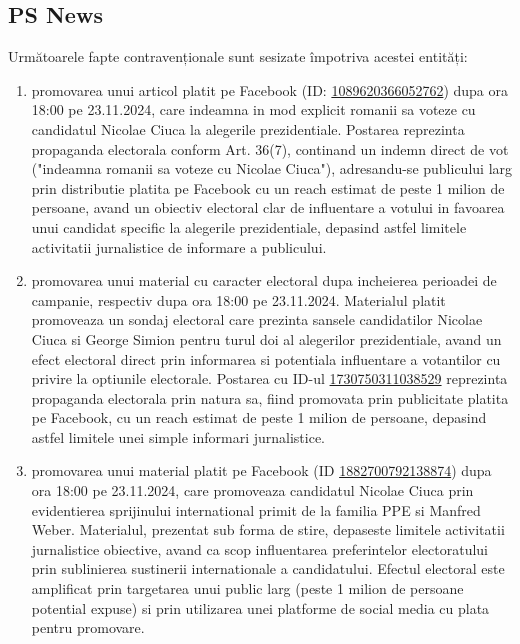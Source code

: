 \documentclass[a4paper,12pt]{article}
\begin{document}
\vspace{0.5cm}

\subsection{PS News}
Următoarele fapte contravenționale sunt sesizate împotriva acestei entități:

\begin{enumerate}[leftmargin=*, label=\arabic*.)]
    \item promovarea unui articol platit pe Facebook (ID: \href{https://www.facebook.com/ads/library/?id=1089620366052762}{1089620366052762}) dupa ora 18:00 pe 23.11.2024, care indeamna in mod explicit romanii sa voteze cu candidatul Nicolae Ciuca la alegerile prezidentiale. Postarea reprezinta propaganda electorala conform Art. 36(7), continand un indemn direct de vot ("indeamna romanii sa voteze cu Nicolae Ciuca"), adresandu-se publicului larg prin distributie platita pe Facebook cu un reach estimat de peste 1 milion de persoane, avand un obiectiv electoral clar de influentare a votului in favoarea unui candidat specific la alegerile prezidentiale, depasind astfel limitele activitatii jurnalistice de informare a publicului.
    \item promovarea unui material cu caracter electoral dupa incheierea perioadei de campanie, respectiv dupa ora 18:00 pe 23.11.2024. Materialul platit promoveaza un sondaj electoral care prezinta sansele candidatilor Nicolae Ciuca si George Simion pentru turul doi al alegerilor prezidentiale, avand un efect electoral direct prin informarea si potentiala influentare a votantilor cu privire la optiunile electorale. Postarea cu ID-ul \href{https://www.facebook.com/ads/library/?id=1730750311038529}{1730750311038529} reprezinta propaganda electorala prin natura sa, fiind promovata prin publicitate platita pe Facebook, cu un reach estimat de peste 1 milion de persoane, depasind astfel limitele unei simple informari jurnalistice.
    \item promovarea unui material platit pe Facebook (ID \href{https://www.facebook.com/ads/library/?id=1882700792138874}{1882700792138874}) dupa ora 18:00 pe 23.11.2024, care promoveaza candidatul Nicolae Ciuca prin evidentierea sprijinului international primit de la familia PPE si Manfred Weber. Materialul, prezentat sub forma de stire, depaseste limitele activitatii jurnalistice obiective, avand ca scop influentarea preferintelor electoratului prin sublinierea sustinerii internationale a candidatului. Efectul electoral este amplificat prin targetarea unui public larg (peste 1 milion de persoane potential expuse) si prin utilizarea unei platforme de social media cu plata pentru promovare.

\end{enumerate}
\end{document}
